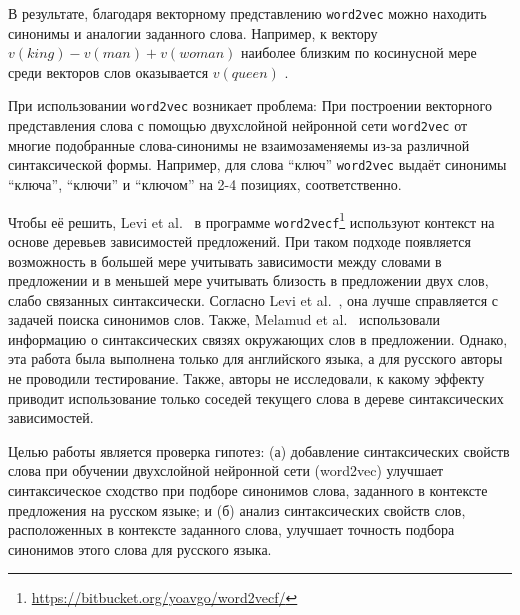 \documentclass[oneside,senior,etd]{BYUPhys}
\begin{document}
В результате, благодаря векторному представлению \texttt{word2vec} можно находить синонимы и аналогии заданного слова. Например, к вектору \(v(king)-v(man)+v(woman)\) наиболее близким по косинусной мере среди векторов слов оказывается \(v(queen)\) \cite{mikolov3}.




При использовании \texttt{word2vec} возникает проблема: При построении векторного представления слова с помощью двухслойной нейронной сети \texttt{word2vec}  от \cite{mikolov1} многие подобранные слова-синонимы не взаимозаменяемы из-за различной синтаксической формы. Например, для слова ``ключ'' \texttt{word2vec} выдаёт синонимы ``ключа'', ``ключи'' и ``ключом'' на 2-4 позициях, соответственно. 


Чтобы её решить, Levi et al.~ в программе \texttt{word2vecf}\footnote{\url{https://bitbucket.org/yoavgo/word2vecf/}}  используют контекст на основе деревьев зависимостей предложений. При таком подходе появляется возможность в большей мере учитывать зависимости между словами в предложении и в меньшей мере учитывать близость в предложении двух слов, слабо связанных синтаксически.
Согласно Levi et al.~, она лучше справляется с задачей поиска синонимов слов. Также, Melamud et al.~ использовали информацию о синтаксических связях окружающих слов в предложении. 
Однако, эта работа была выполнена только для английского языка, а для русского авторы не проводили тестирование. Также, авторы не исследовали, к какому эффекту приводит использование только соседей текущего слова в дереве синтаксических зависимостей.

Целью работы является проверка гипотез: (а) добавление синтаксических свойств слова при обучении двухслойной нейронной сети (word2vec) улучшает синтаксическое сходство при подборе синонимов слова, заданного в контексте предложения на русском языке; и (б) анализ синтаксических свойств слов, расположенных в контексте заданного слова, улучшает точность подбора синонимов этого слова для русского языка.


\end{document}
